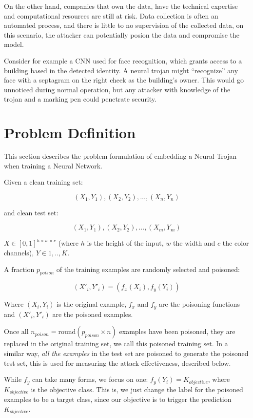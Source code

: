 \documentclass[letterpaper, 10 pt, conference]{ieeeconf}  %
\begin{document}
On the other hand, companies that own the data, have the technical expertise and computational resources are still at risk. Data collection is often an automated process, and there is little to no supervision of the collected data, on this scenario, the attacker can potentially posion the data and compromise the model.

Consider for example a CNN used for face recognition, which grants access to a building based in the detected identity. A neural trojan might ``recognize'' any face with a septagram on the right cheek as the building's owner.  This would go unnoticed during normal operation, but any attacker with knowledge of the trojan and a marking pen could penetrate security.


\section{Problem Definition}

This section describes the problem formulation of embedding a Neural Trojan
when training a Neural Network.

Given a clean training set:

$$(X_1, Y_1), (X_2, Y_2),..., (X_n, Y_n)$$

and clean test set:

$$(X_1, Y_1), (X_2, Y_2),..., (X_m, Y_m)$$

$X \in [0, 1]^{h \times w \times c}$ (where $h$ is the height of the input, $w$ the width and $c$ the color channels), $Y \in 1,..,K$.

A fraction $p_{poison}$ of the training examples are randomly selected and poisoned:

$$(X'_i, Y'_i) = (f_x(X_i), f_y(Y_i))$$

Where $(X_i, Y_i)$ is the original example, $f_x$ and $f_y$ are the poisoning functions and $(X'_i, Y'_i)$ are the poisoned examples.

Once all $n_{poison} = \text{round}(p_{poison} \times n)$ examples have been poisoned, they are replaced in the original training set, we call this poisoned training set. In a similar way, \textit{all the examples} in the test set are poisoned to generate the poisoned test set, this is used for measuring
the attack effectiveness, described below.

While $f_y$ can take many forms, we focus on one: $f_y(Y_i) = K_{objective}$, where $K_{objective}$ is the objective class. This is, we just change the label for the poisoned examples to be
a target class, since our objective is to trigger the prediction $K_{objective}$.
\end{document}
